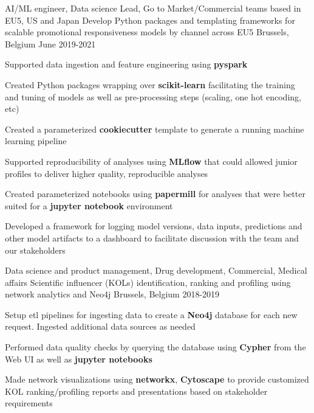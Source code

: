 \begin{cventries}
  \cventry
    {AI/ML engineer, Data science Lead, Go to Market/Commercial teams based in EU5, US and Japan} %
    {Develop Python packages and templating frameworks for scalable promotional responsiveness models by channel across EU5} %
    {Brussels, Belgium} %
    {June 2019-2021} %
    {
    \begin{cvitems}
        \item Supported data ingestion and feature engineering using \textbf{pyspark}
        \item Created Python packages wrapping over \textbf{scikit-learn} facilitating the training and tuning of models as well as pre-processing steps (scaling, one hot encoding, etc)
        \item Created a parameterized \textbf{cookiecutter} template to generate a running machine learning pipeline
        \item Supported reproducibility of analyses using \textbf{MLflow} that could allowed junior profiles to deliver higher quality, reproducible analyses
        \item Created parameterized notebooks using \textbf{papermill} for analyses that were better suited for a \textbf{jupyter notebook} environment
        \item Developed a framework for logging model versions, data inputs, predictions and other model artifacts to a dashboard to facilitate discussion with the team and our stakeholders    
    \end{cvitems}
    }
\vspace{2mm}
    \cventry
    {Data science and product management, Drug development, Commercial, Medical affairs} %
    {Scientific influencer (KOLs) identification, ranking and profiling using network analytics and Neo4j} %
    {Brussels, Belgium} %
    {2018-2019} %
    {
     \begin{cvitems}
        \item Setup etl pipelines for ingesting data to create a \textbf{Neo4j} database for each new request. Ingested additional data sources as needed
        \item Performed data quality checks by querying the database using \textbf{Cypher} from the Web UI as well as \textbf{jupyter notebooks}
        \item Made network visualizations using \textbf{networkx}, \textbf{Cytoscape} to provide customized KOL ranking/profiling reports and presentations based on stakeholder requirements      
    \end{cvitems}
    }
\vspace{2mm}


\end{cventries}
